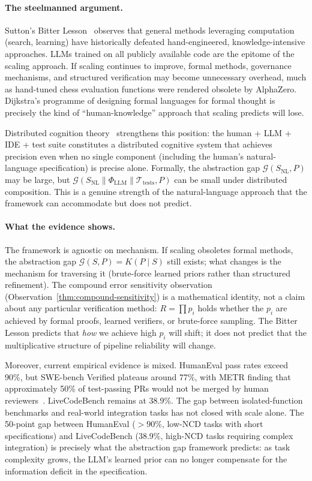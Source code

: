 \documentclass[11pt, a4paper]{googledeepmind}
\begin{document}
\paragraph{The steelmanned argument.}
Sutton's Bitter Lesson~\citep{sutton2019bitter} observes that general methods
leveraging computation (search, learning) have historically defeated
hand-engineered, knowledge-intensive approaches.  LLMs trained on all publicly
available code are the epitome of the scaling approach.  If scaling continues to
improve, formal methods, governance mechanisms, and structured verification may
become unnecessary overhead, much as hand-tuned chess evaluation functions were
rendered obsolete by AlphaZero.  Dijkstra's programme of designing formal
languages for formal thought is precisely the kind of ``human-knowledge''
approach that scaling predicts will lose.

Distributed cognition theory~\citep{hutchins1995cognition, clark2003natural}
strengthens this position: the human + LLM + IDE + test suite constitutes a
distributed cognitive system that achieves precision even when no single
component (including the human's natural-language specification) is precise
alone.  Formally, the abstraction gap $\mathcal{G}(S_{\text{NL}}, P)$ may be
large, but $\mathcal{G}(S_{\text{NL}} \parallel \Phi_{\text{LLM}} \parallel
\mathcal{T}_{\text{tests}}, P)$ can be small under distributed composition.
This is a genuine strength of the natural-language approach that the framework
can accommodate but does not predict.

\paragraph{What the evidence shows.}
The framework is agnostic on mechanism.  If scaling obsoletes formal methods,
the abstraction gap $\mathcal{G}(S, P) = K(P \mid S)$ still exists; what
changes is the mechanism for traversing it (brute-force learned priors rather
than structured refinement).  The compound error sensitivity observation
(Observation~\ref{thm:compound-sensitivity}) is a mathematical identity, not a claim about
any particular verification method: $R = \prod p_i$ holds whether the $p_i$ are
achieved by formal proofs, learned verifiers, or brute-force sampling.  The
Bitter Lesson predicts that \emph{how} we achieve high $p_i$ will shift; it
does not predict that the multiplicative structure of pipeline reliability will
change.

Moreover, current empirical evidence is mixed.  HumanEval pass rates exceed
90\%, but SWE-bench Verified plateaus around 77\%, with METR finding that
approximately 50\% of test-passing PRs would not be merged by human
reviewers~\citep{metr2026swebench}.  LiveCodeBench remains at 38.9\%.  The gap
between isolated-function benchmarks and real-world integration tasks has not
closed with scale alone.  The 50-point gap between HumanEval ($> 90\%$, low-NCD
tasks with short specifications) and LiveCodeBench (38.9\%, high-NCD tasks
requiring complex integration) is precisely what the abstraction gap framework
predicts: as task complexity grows, the LLM's learned prior can no longer
compensate for the information deficit in the specification.
\end{document}
